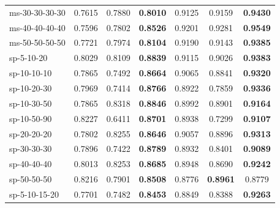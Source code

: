 \begin{table}[!ht]
{\begin{tabular}{lcccccc}
    ms-30-30-30-30 & 0.7615 & 0.7880 & \textbf{0.8010} & 0.9125 & 0.9159 & \textbf{0.9430} \\
    ms-40-40-40-40 & 0.7596 & 0.7802 & \textbf{0.8526} & 0.9201 & 0.9281 & \textbf{0.9549} \\
    ms-50-50-50-50 & 0.7721 & 0.7974 & \textbf{0.8104} & 0.9190 & 0.9143 & \textbf{0.9385} \\
    \hline\hline
    sp-5-10-20 & 0.8029 & 0.8109 & \textbf{0.8839} & 0.9115 & 0.9026 & \textbf{0.9383} \\
    sp-10-10-10 & 0.7865 & 0.7492 & \textbf{0.8664} & 0.9065 & 0.8841 & \textbf{0.9320} \\
    sp-10-20-30 & 0.7969 & 0.7414 & \textbf{0.8766} & 0.8922 & 0.7859 & \textbf{0.9336} \\
    sp-10-30-50 & 0.7865 & 0.8318 & \textbf{0.8846} & 0.8992 & 0.8901 & \textbf{0.9164} \\
    sp-10-50-90 & 0.8227 & 0.6411 & \textbf{0.8701} & 0.8938 & 0.7299 & \textbf{0.9107} \\
    sp-20-20-20 & 0.7802 & 0.8255 & \textbf{0.8646} & 0.9057 & 0.8896 & \textbf{0.9313} \\
    sp-30-30-30 & 0.7896 & 0.7422 & \textbf{0.8789} & 0.8932 & 0.8401 & \textbf{0.9089} \\
    sp-40-40-40 & 0.8013 & 0.8253 & \textbf{0.8685} & 0.8948 & 0.8690 & \textbf{0.9242} \\
    sp-50-50-50 & 0.8216 & 0.7901 & \textbf{0.8508} & 0.8776 & \textbf{0.8961} & 0.8779 \\
    sp-5-10-15-20                 & 0.7701                           & 0.7482                           & \textbf{0.8453} & 0.8849                           & 0.8388                           & \textbf{0.9263} \\

\end{tabular}}
\end{table}
